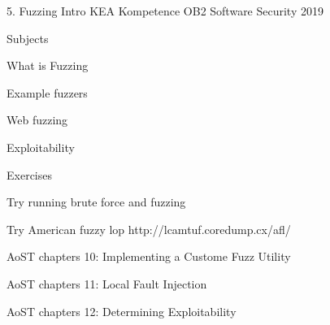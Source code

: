 \documentclass[Screen16to9,17pt]{foils}
\begin{document}
\mytitlepage
{5. Fuzzing Intro}
{KEA Kompetence OB2 Software Security 2019}


\begin{list1}
\item Subjects
\begin{list2}
\item What is Fuzzing
\item Example fuzzers
\item Web fuzzing
\item Exploitability
\end{list2}
\item Exercises
\begin{list2}
\item Try running brute force and fuzzing
\item Try American fuzzy lop http://lcamtuf.coredump.cx/afl/
\end{list2}
\end{list1}


\begin{list1}
\item AoST chapters 10: Implementing a Custome Fuzz Utility
\item AoST chapters 11: Local Fault Injection
\item AoST chapters 12: Determining Exploitability
\end{list1}



\begin{list1}
\item
\end{list1}






\end{document}
